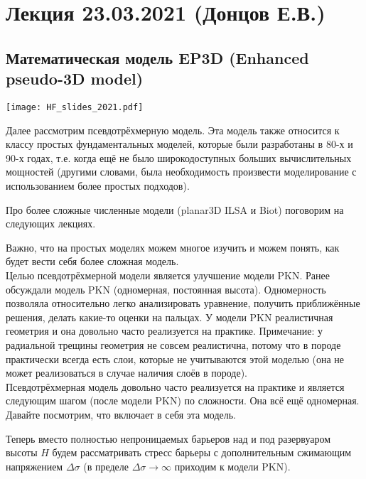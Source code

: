 \documentclass[main.tex]{subfiles}
\begin{document}

\section{Лекция 23.03.2021 (Донцов Е.В.)}

\subsection{Математическая модель EP3D (Enhanced pseudo-3D model)}

\texttt{[image: HF\_slides\_2021.pdf]}

Далее рассмотрим псевдотрёхмерную модель.
Эта модель также относится к классу простых фундаментальных моделей, которые были разработаны в 80-х и 90-х годах, т.е. когда ещё не было широкодоступных больших вычислительных мощностей (другими словами, была необходимость произвести моделирование с использованием более простых подходов).

Про более сложные численные модели (planar3D ILSA и Biot) поговорим на следующих лекциях.

Важно, что на простых моделях можем многое изучить и можем понять, как будет вести себя более сложная модель.
\\

Целью псевдотрёхмерной модели является улучшение модели PKN.
Ранее обсуждали модель PKN (одномерная, постоянная высота).
Одномерность позволяла относительно легко анализировать уравнение, получить приближённые решения, делать какие-то оценки на пальцах.
У модели PKN реалистичная геометрия и она довольно часто реализуется на практике.
Примечание: у радиальной трещины геометрия не совсем реалистична, потому что в породе практически всегда есть слои, которые не учитываются этой моделью (она не может реализоваться в случае наличия слоёв в породе).
\\

Псевдотрёхмерная модель довольно часто реализуется на практике и является следующим шагом (после модели PKN) по сложности.
Она всё ещё одномерная.
\\

Давайте посмотрим, что включает в себя эта модель.

Теперь вместо полностью непроницаемых барьеров над и под разервуаром высоты $H$ будем рассматривать стресс барьеры с дополнительным сжимающим напряжением $\Delta\sigma$ (в пределе $\Delta\sigma\to\infty$ приходим к модели PKN).
\end{document}
